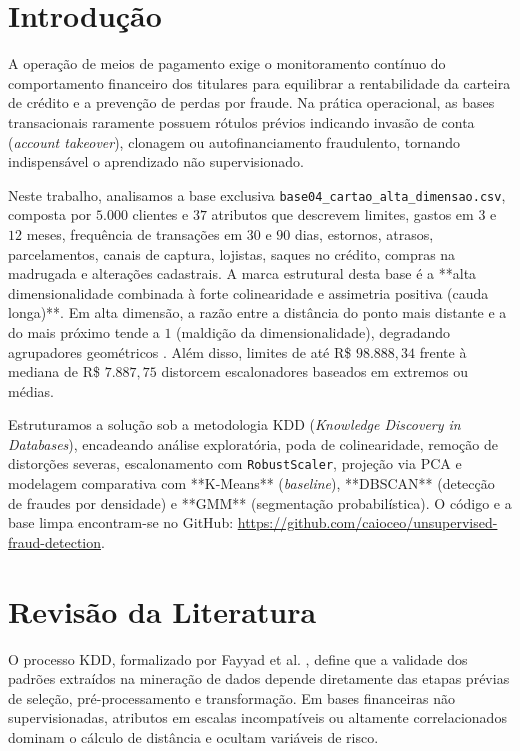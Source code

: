 \documentclass[10pt,twocolumn]{article}
\begin{document}
\section{Introdução}

A operação de meios de pagamento exige o monitoramento contínuo do comportamento financeiro dos titulares para equilibrar a rentabilidade da carteira de crédito e a prevenção de perdas por fraude. Na prática operacional, as bases transacionais raramente possuem rótulos prévios indicando invasão de conta (\textit{account takeover}), clonagem ou autofinanciamento fraudulento, tornando indispensável o aprendizado não supervisionado.

Neste trabalho, analisamos a base exclusiva \texttt{base04\_cartao\_alta\_dimensao.csv}, composta por $5.000$ clientes e $37$ atributos que descrevem limites, gastos em $3$ e $12$ meses, frequência de transações em $30$ e $90$ dias, estornos, atrasos, parcelamentos, canais de captura, lojistas, saques no crédito, compras na madrugada e alterações cadastrais. A marca estrutural desta base é a **alta dimensionalidade combinada à forte colinearidade e assimetria positiva (cauda longa)**. Em alta dimensão, a razão entre a distância do ponto mais distante e a do mais próximo tende a $1$ (maldição da dimensionalidade), degradando agrupadores geométricos \cite{jolliffe2002}. Além disso, limites de até R\$ $98.888,34$ frente à mediana de R\$ $7.887,75$ distorcem escalonadores baseados em extremos ou médias.

Estruturamos a solução sob a metodologia KDD (\textit{Knowledge Discovery in Databases}), encadeando análise exploratória, poda de colinearidade, remoção de distorções severas, escalonamento com \texttt{RobustScaler}, projeção via PCA e modelagem comparativa com **K-Means** (\textit{baseline}), **DBSCAN** (detecção de fraudes por densidade) e **GMM** (segmentação probabilística). O código e a base limpa encontram-se no GitHub: \url{https://github.com/caioceo/unsupervised-fraud-detection}.

\section{Revisão da Literatura}

O processo KDD, formalizado por Fayyad et al. \cite{fayyad1996}, define que a validade dos padrões extraídos na mineração de dados depende diretamente das etapas prévias de seleção, pré-processamento e transformação. Em bases financeiras não supervisionadas, atributos em escalas incompatíveis ou altamente correlacionados dominam o cálculo de distância e ocultam variáveis de risco.
\end{document}
